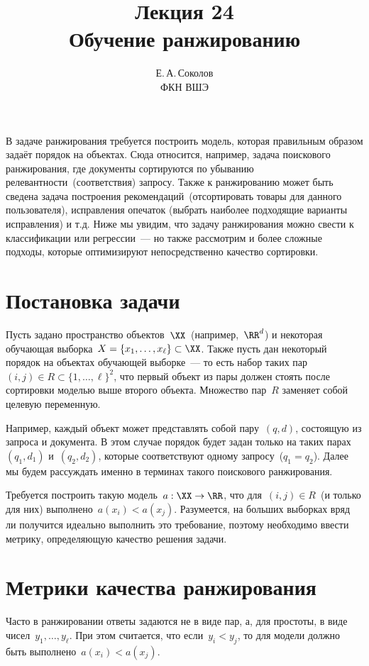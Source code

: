 \documentclass[12pt,fleqn]{article}
\begin{document}
\title{Лекция 24\\Обучение ранжированию}
\author{Е.\,А.\,Соколов\\ФКН ВШЭ}
\maketitle

В задаче ранжирования требуется построить модель, которая правильным образом
задаёт порядок на объектах.
Сюда относится, например, задача поискового ранжирования, где документы сортируются
по убыванию релевантности~(соответствия) запросу.
Также к ранжированию может быть сведена задача построения рекомендаций~(отсортировать товары
для данного пользователя),
исправления опечаток (выбрать наиболее подходящие варианты исправления) и т.д.
Ниже мы увидим, что задачу ранжирования можно свести к классификации или регрессии~---
но также рассмотрим и более сложные подходы, которые оптимизируют непосредственно
качество сортировки.

\section{Постановка задачи}
Пусть задано пространство объектов~$\XX$~(например,~$\RR^d$)
и некоторая обучающая выборка~$X = \{x_1, \dots, x_\ell\} \subset \XX$.
Также пусть дан некоторый порядок на объектах обучающей выборке~---
то есть набор таких пар~$(i, j) \in R \subset \{1, \dots, \ell\}^2$, что первый объект из пары
должен стоять после сортировки моделью выше второго объекта.
Множество пар~$R$ заменяет собой целевую переменную.

Например, каждый объект может представлять собой пару~$(q, d)$,
состоящую из запроса и документа.
В этом случае порядок будет задан только на таких парах~$(q_1, d_1)$ и~$(q_2, d_2)$,
которые соответствуют одному запросу~($q_1 = q_2$).
Далее мы будем рассуждать именно в терминах такого поискового ранжирования.

Требуется построить такую модель~$a: \XX \to \RR$,
что для~$(i, j) \in R$~(и только для них) выполнено~$a(x_i) < a(x_j)$.
Разумеется, на больших выборках вряд ли получится идеально выполнить это требование,
поэтому необходимо ввести метрику, определяющую качество решения задачи.

\section{Метрики качества ранжирования}

Часто в ранжировании ответы задаются не в виде пар, а, для простоты,
в виде чисел~$y_1, \dots, y_\ell$.
При этом считается, что если~$y_i < y_j$, то для модели должно быть выполнено~$a(x_i) < a(x_j)$.
\end{document}
